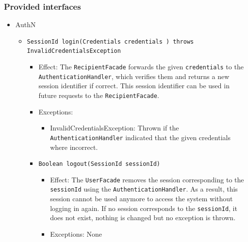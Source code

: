 \documentclass[a4paper,10pt]{article}
\begin{document}
\subsubsection*{Provided interfaces}
\begin{itemize}
    \item AuthN
    \begin{itemize}
        \item \texttt{SessionId login(Credentials credentials ) throws InvalidCredentialsException}
        \begin{itemize}
            \item Effect: The \texttt{RecipientFacade} forwards the given \texttt{credentials} to the \texttt{AuthenticationHandler}, which verifies them and returns a new session identifier if correct. This session identifier can be used in future requests to the \texttt{RecipientFacade}.
            \item Exceptions:
            \begin{itemize}
                \item InvalidCredentialsException: Thrown if the \texttt{AuthenticationHandler} indicated that the given credentials where incorrect.
            \end{itemize}

            \item \texttt{Boolean logout(SessionId sessionId)}
            \begin{itemize}
                \item Effect: The \texttt{UserFacade} removes the session corresponding to the \texttt{sessionId} using the \texttt{AuthenticationHandler}. As a result, this session cannot be used anymore to access the system without logging in again. If no session corresponds to the \texttt{sessionId}, it does not exist, nothing is changed but no exception is thrown.
                \item Exceptions: None
            \end{itemize}
        \end{itemize}
    \end{itemize}


\end{itemize}
\end{document}
